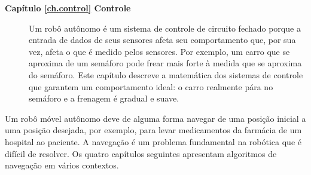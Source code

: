 \begin{description}
\item [\textbf{Capítulo \ref{ch.control} Controle}] Um robô autônomo é um sistema de controle de circuito fechado porque a entrada de dados de seus sensores afeta seu comportamento que, por sua vez, afeta o que é medido pelos sensores. Por exemplo, um carro que se aproxima de um semáforo pode frear mais forte à medida que se aproxima do semáforo. Este capítulo descreve a matemática dos sistemas de controle que garantem um comportamento ideal: o carro realmente pára no semáforo e a frenagem é gradual e suave.
\end{description}

Um robô móvel autônomo deve de alguma forma navegar de uma posição inicial a uma posição desejada, por exemplo, para levar medicamentos da farmácia de um hospital ao paciente. A navegação é um problema fundamental na robótica que é difícil de resolver. Os quatro capítulos seguintes apresentam algoritmos de navegação em vários contextos.
